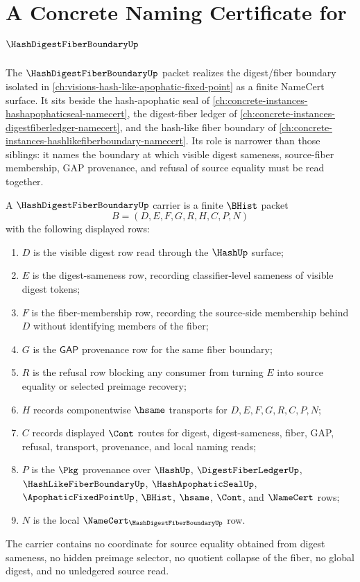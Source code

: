 \chapter{A Concrete Naming Certificate for $\HashDigestFiberBoundaryUp$}
\label{ch:concrete-instances-hash-digest-fiber-boundary-namecert}

The $\HashDigestFiberBoundaryUp$ packet realizes the digest/fiber boundary isolated in \autoref{ch:visions-hash-like-apophatic-fixed-point} as a finite NameCert surface. It sits beside the hash-apophatic seal of \autoref{ch:concrete-instances-hashapophaticseal-namecert}, the digest-fiber ledger of \autoref{ch:concrete-instances-digestfiberledger-namecert}, and the hash-like fiber boundary of \autoref{ch:concrete-instances-hashlikefiberboundary-namecert}. Its role is narrower than those siblings: it names the boundary at which visible digest sameness, source-fiber membership, GAP provenance, and refusal of source equality must be read together.

\begin{definition}
\label{def:hash-digest-fiber-boundary-carrier}
A $\HashDigestFiberBoundaryUp$ carrier is a finite $\BHist$ packet
$$
B=(D,E,F,G,R,H,C,P,N)
$$
with the following displayed rows:
\begin{enumerate}
\item $D$ is the visible digest row read through the $\HashUp$ surface;
\item $E$ is the digest-sameness row, recording classifier-level sameness of visible digest tokens;
\item $F$ is the fiber-membership row, recording the source-side membership behind $D$ without identifying members of the fiber;
\item $G$ is the $\mathsf{GAP}$ provenance row for the same fiber boundary;
\item $R$ is the refusal row blocking any consumer from turning $E$ into source equality or selected preimage recovery;
\item $H$ records componentwise $\hsame$ transports for $D,E,F,G,R,C,P,N$;
\item $C$ records displayed $\Cont$ routes for digest, digest-sameness, fiber, GAP, refusal, transport, provenance, and local naming reads;
\item $P$ is the $\Pkg$ provenance over $\HashUp$, $\DigestFiberLedgerUp$, $\HashLikeFiberBoundaryUp$, $\HashApophaticSealUp$, $\ApophaticFixedPointUp$, $\BHist$, $\hsame$, $\Cont$, and $\NameCert$ rows;
\item $N$ is the local $\NameCert_{\HashDigestFiberBoundaryUp}$ row.
\end{enumerate}
The carrier contains no coordinate for source equality obtained from digest sameness, no hidden preimage selector, no quotient collapse of the fiber, no global digest, and no unledgered source read.
\end{definition}

